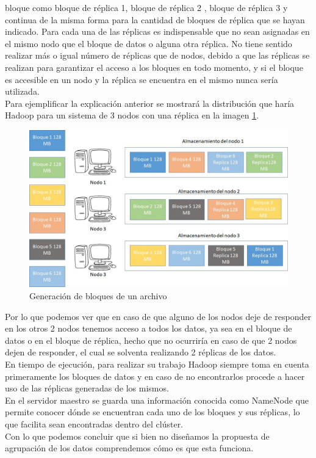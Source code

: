 bloque como bloque de réplica 1, bloque de réplica 2 , bloque de réplica 3 y continua de la
misma forma para la cantidad de bloques de réplica que se hayan indicado. Para cada una
de las réplicas es indispensable que no sean asignadas en el mismo nodo que el bloque de
datos o alguna otra réplica. No tiene sentido realizar más o igual número de réplicas que de
nodos, debido a que las réplicas se realizan para garantizar el acceso a los bloques en todo
momento, y si el bloque es accesible en un nodo y la réplica se encuentra en el mismo
nunca sería utilizada.
\\
Para ejemplificar la explicación anterior se mostrará la distribución que haría Hadoop para un sistema de 3 nodos con una réplica en
la imagen \ref{fig:red3}.
\newpage
\begin{figure}[!htbp]
	\hypertarget{fig:red3}{\hspace{1pt}}
	\begin{center}
		\includegraphics[width=.7\textwidth]{capitulo3/images/im3.png}
		\caption{Generación de bloques de un archivo}
		\label{fig:red3}
	\end{center}
\end{figure}
Por lo que podemos ver que en caso de que alguno de los nodos deje de responder en los
otros 2 nodos tenemos acceso a todos los datos, ya sea en el bloque de datos o en el
bloque de réplica, hecho que no ocurriría en caso de que 2 nodos dejen de responder, el
cual se solventa realizando 2 réplicas de los datos.
\\
En tiempo de ejecución, para realizar su trabajo Hadoop siempre toma en cuenta primeramente los bloques de datos
y en caso de no encontrarlos procede a hacer uso de las réplicas generadas de los mismos.
\\
En el servidor maestro se guarda una información conocida como NameNode que permite
conocer dónde se encuentran cada uno de los bloques y sus réplicas, lo que facilita sean encontradas dentro del clúster.
\\
Con lo que podemos concluir que si bien no diseñamos la propuesta de agrupación de los datos comprendemos cómo es que esta funciona.
